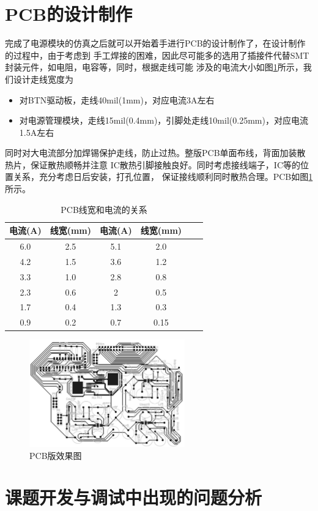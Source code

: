 \documentclass[a4paper]{paper}
\begin{document}
\section{PCB的设计制作}
完成了电源模块的仿真之后就可以开始着手进行PCB的设计制作了，在设计制作的过程中，由于考虑到
手工焊接的困难，因此尽可能多的选用了插接件代替SMT封装元件，如电阻，电容等，同时，根据走线可能
涉及的电流大小如图\ref{fig4}所示，我们设计走线宽度为
\begin{itemize}
    \item 对BTN驱动板，走线40mil(1mm)，对应电流3A左右
    \item 对电源管理模块，走线15mil(0.4mm)，引脚处走线10mil(0.25mm)，对应电流1.5A左右
\end{itemize}
同时对大电流部分加焊锡保护走线，防止过热。整版PCB单面布线，背面加装散热片，保证散热顺畅并注意
IC散热引脚接触良好。同时考虑接线端子，IC等的位置关系，充分考虑日后安装，打孔位置，
保证接线顺利同时散热合理。PCB如图\ref{pcb}所示。
\begin{table}
    \centering
    \caption{PCB线宽和电流的关系}
    \label{fig4}
    \begin{tabular}{|c|c|c|c|c|c|} \hline
        电流(A)&线宽(mm)&电流(A)&线宽(mm)\\ \hline
        6.0&2.5&5.1&2.0\\ \hline
        4.2&1.5&3.6&1.2\\ \hline
        3.3&1.0&2.8&0.8\\ \hline
        2.3&0.6&2&0.5\\ \hline
        1.7&0.4&1.3&0.3\\ \hline
        0.9&0.2&0.7&0.15\\ \hline
    \end{tabular}
\end{table}
\begin{figure}
    \centering
    \includegraphics[width = 0.6\textwidth]{../preview/pcb_fin.jpg}
    \caption{PCB版效果图}
    \label{pcb}
\end{figure}
\section{课题开发与调试中出现的问题分析}
\end{document}
